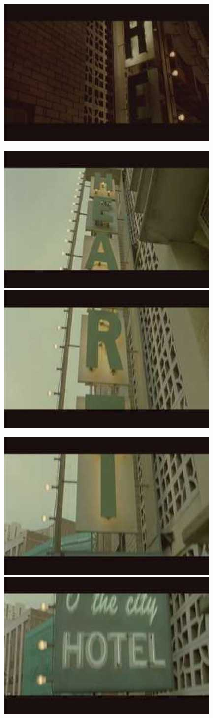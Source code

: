 \documentclass[UTF8]{ctexart}
\begin{document}
\begin{figure}[htb]
\centering
\includegraphics[width=0.5\linewidth]{fig/read_Matrix-81}
\end{figure}

\begin{figure}[htb]
\centering
\includegraphics[width=0.45\linewidth]{fig/read_Matrix-82}
\includegraphics[width=0.45\linewidth]{fig/read_Matrix-83}

\vspace{3pt}

\includegraphics[width=0.45\linewidth]{fig/read_Matrix-84}
\includegraphics[width=0.45\linewidth]{fig/read_Matrix-85}
\end{figure}
\end{document}
